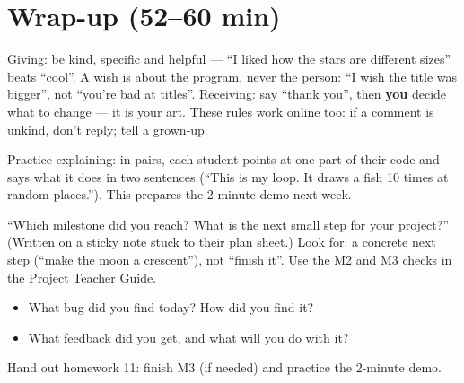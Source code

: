 \section{Wrap-up (52--60 min)}
\begin{safety}
Giving: be kind, specific and helpful --- \enquote{I liked how the stars are different sizes} beats \enquote{cool}. A wish is about the program, never the person: \enquote{I wish the title was bigger}, not \enquote{you're bad at titles}. Receiving: say \enquote{thank you}, then \textbf{you} decide what to change --- it is your art. These rules work online too: if a comment is unkind, don't reply; tell a grown-up.
\end{safety}
Practice explaining: in pairs, each student points at one part of their code and says what it does in two sentences (\enquote{This is my loop. It draws a fish 10 times at random places.}). This prepares the 2-minute demo next week.
\begin{formativecheck}
\enquote{Which milestone did you reach? What is the next small step for your project?} (Written on a sticky note stuck to their plan sheet.) Look for: a concrete next step (\enquote{make the moon a crescent}), not \enquote{finish it}. Use the M2 and M3 checks in the Project Teacher Guide.
\end{formativecheck}
\begin{reflection}
\begin{itemize}[leftmargin=1.2em,itemsep=1pt]
  \item What bug did you find today? How did you find it?
  \item What feedback did you get, and what will you do with it?
\end{itemize}
Hand out homework 11: finish M3 (if needed) and practice the 2-minute demo.
\end{reflection}

